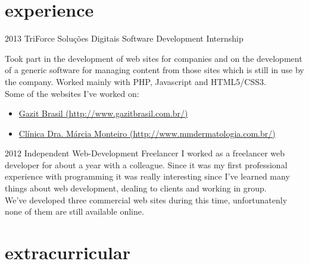 \documentclass[]{friggeri-cv} %
\begin{document}

\section{experience}

\begin{entrylist}


\entry
{2013}
{TriForce Soluções Digitais}
{Software Development Internship}
{Took part in the development of web sites for companies and on the development of a generic software for managing content from those sites which is still in use by the company. Worked mainly with PHP, Javascript and HTML5/CSS3. \\
Some of the websites I've worked on:
\begin{itemize}
\item \href{http://www.gazitbrasil.com.br/}{Gazit Brasil (http://www.gazitbrasil.com.br/)}
\item \href{http://www.mmdermatologia.com.br/}{Clínica Dra. Márcia Monteiro (http://www.mmdermatologia.com.br/)}
\end{itemize}}

\entry
{2012}
{Independent Web-Development}
{Freelancer}
{I worked as a freelancer web developer for about a year with a colleague. Since it was my first professional experience with programming it was really interesting since I've learned many things about web development, dealing to clients and working in group. \\
We've developed three commercial web sites during this time, unfortunatenly none of them are still available online.}

\end{entrylist}


\section{extracurricular}
\end{document}
